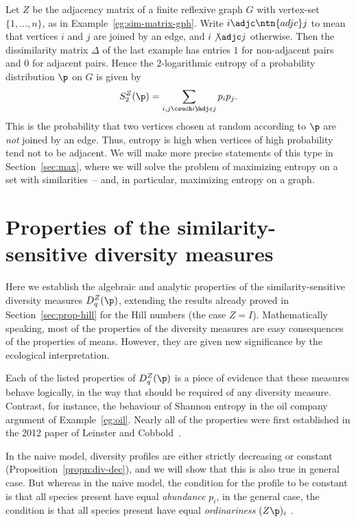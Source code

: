 \begin{example}
Let $Z$ be the adjacency%
%
% 
matrix of a finite
reflexive graph%
%
% 
$G$ with vertex-set $\{1, \ldots, n\}$, as in
Example~\ref{eg:sim-matrix-gph}.  Write $i \adjc\ntn{adjc} j$ to mean that
vertices $i$ and $j$ are joined by an edge, and $i \not\adjc j$ otherwise.
Then the dissimilarity matrix $\Delta$ of the last example has entries $1$
for non-adjacent pairs and $0$ for adjacent pairs.  Hence the
$2$-logarithmic entropy of a probability distribution $\p$ on $G$ is given
by
\[
S_2^Z(\p) = \sum_{i, j \csuch i \not\adjc j} p_i p_j.
\]
This is the probability that two vertices chosen at random according to
$\p$ are \emph{not} joined by an edge.  Thus, entropy is high when vertices
of high probability tend not to be adjacent.  We will make more precise
statements of this type in Section~\ref{sec:max}, where we will solve the
problem of maximizing entropy on a set with similarities~-- and, in
particular, maximizing entropy on a graph.
\end{example}


\section{Properties of the similarity-sensitive diversity measures}


Here we establish the algebraic and analytic properties of the
similarity-sensitive diversity measures $D_q^Z(\p)$, extending the results
already proved in Section~\ref{sec:prop-hill} for the Hill numbers (the
case $Z = I$).  Mathematically speaking, most of the properties of the
diversity measures are easy consequences of the properties of means.
However, they are given new significance by the ecological interpretation.

Each of the listed properties of $D_q^Z(\p)$ is a piece of evidence that
these measures behave logically,%
%
%
in the way that should be required of any diversity measure.  Contrast,
for instance, the behaviour of Shannon entropy in the oil company argument
of Example~\ref{eg:oil}.  Nearly all of the properties were first
established in the 2012 paper of Leinster and Cobbold~\cite{MDISS}.%
% 

In the naive model, diversity profiles are either strictly decreasing or
constant (Proposition~\ref{propn:div-dec}), and we will show that this is
also true in general case.  But whereas in the naive model, the condition
for the profile to be constant is that all species present have equal
\emph{abundance} $p_i$, in the general case, the condition is that all
species present have equal \emph{ordinariness}
$(Z\p)_i$ .

